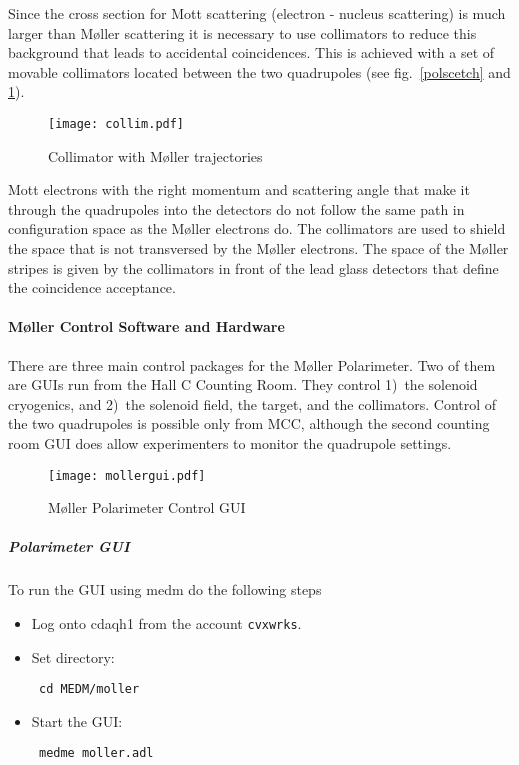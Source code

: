 Since the cross section for Mott scattering (electron - nucleus
scattering) is much larger than M\o ller scattering it is necessary
to use collimators to reduce this background that leads to accidental
coincidences. This is achieved with a set of movable collimators
located between the two quadrupoles (see fig.~\ref{polscetch} 
and \ref{colscetch}). 
%
\begin{figure}
\texttt{[image: collim.pdf]}
\begin{center}
\caption{Collimator with M\o ller trajectories\label{colscetch}}
\end{center}
\end{figure}
Mott electrons with the right momentum and scattering angle that make it
through the quadrupoles into the detectors do not follow the same
path in configuration space as 
the M\o ller electrons do.  The collimators are used to shield the
space that is not transversed by the M\o ller electrons. The space of
the M\o ller stripes is  
given by the collimators in front of the lead glass detectors
that define the coincidence acceptance.
%

\paragraph{M\o ller Control Software and Hardware}
There are three main control packages for the M\o ller Polarimeter.
Two of them are GUIs run from the Hall C Counting Room. They
control 1)~the solenoid cryogenics, and 2)~the solenoid field, 
the target, and the collimators. Control of the two quadrupoles
is possible only from MCC, although the second counting room GUI does
allow experimenters to monitor the quadrupole settings.


\begin{figure}
  \begin{center}
  \texttt{[image: mollergui.pdf]}
  \caption{M\o ller Polarimeter Control GUI\label{molpolmedm}}
  \end{center}
\end{figure}
%

\subparagraph{Polarimeter GUI}

To run the GUI using medm do the following steps
\begin{itemize}
\item Log onto cdaqh1 from the account {\tt cvxwrks}.
\item Set directory: \begin{verbatim} cd MEDM/moller \end{verbatim}
\item Start the GUI: \begin{verbatim} medme moller.adl  \end{verbatim} 
\end{itemize}
%

